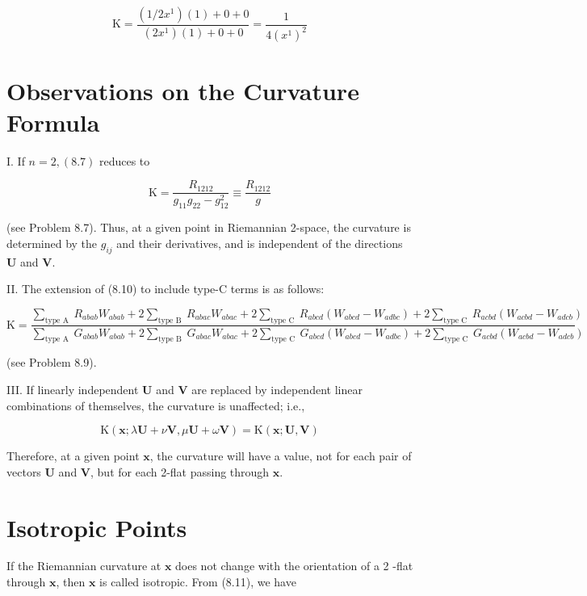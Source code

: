 \documentclass[10pt]{article}
\begin{document}
$$
\mathrm{K}=\frac{\left(1 / 2 x^{1}\right)(1)+0+0}{\left(2 x^{1}\right)(1)+0+0}=\frac{1}{4\left(x^{1}\right)^{2}}
$$

\section*{Observations on the Curvature Formula}
I. If $n=2,(8.7)$ reduces to


\begin{equation*}
\mathrm{K}=\frac{R_{1212}}{g_{11} g_{22}-g_{12}^{2}} \equiv \frac{R_{1212}}{g} \tag{8.11}
\end{equation*}


(see Problem 8.7). Thus, at a given point in Riemannian 2-space, the curvature is determined by the $g_{i j}$ and their derivatives, and is independent of the directions $\mathbf{U}$ and $\mathbf{V}$.

II. The extension of (8.10) to include type-C terms is as follows:


\begin{equation*}
\mathrm{K}=\frac{\sum_{\text {type A }} R_{a b a b} W_{a b a b}+2 \sum_{\text {type B }} R_{a b a c} W_{a b a c}+2 \sum_{\text {type C }} R_{a b c d}\left(W_{a b c d}-W_{a d b c}\right)+2 \sum_{\text {type C }} R_{a c b d}\left(W_{a c b d}-W_{a d c b}\right)}{\sum_{\text {type A }} G_{a b a b} W_{a b a b}+2 \sum_{\text {type B }} G_{a b a c} W_{a b a c}+2 \sum_{\text {type C }} G_{a b c d}\left(W_{a b c d}-W_{a d b c}\right)+2 \sum_{\text {type C }} G_{a c b d}\left(W_{a c b d}-W_{a d c b}\right)} \tag{8.12}
\end{equation*}


(see Problem 8.9).

III. If linearly independent $\mathbf{U}$ and $\mathbf{V}$ are replaced by independent linear combinations of themselves, the curvature is unaffected; i.e.,


\begin{equation*}
\mathrm{K}(\mathbf{x} ; \lambda \mathbf{U}+\nu \mathbf{V}, \mu \mathbf{U}+\omega \mathbf{V})=\mathrm{K}(\mathbf{x} ; \mathbf{U}, \mathbf{V}) \tag{8.13}
\end{equation*}


Therefore, at a given point $\mathbf{x}$, the curvature will have a value, not for each pair of vectors $\mathbf{U}$ and $\mathbf{V}$, but for each 2-flat passing through $\mathbf{x}$.

\section*{Isotropic Points}
If the Riemannian curvature at $\mathbf{x}$ does not change with the orientation of a 2 -flat through $\mathbf{x}$, then $\mathbf{x}$ is called isotropic. From (8.11), we have
\end{document}
